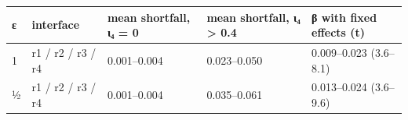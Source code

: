 \documentclass[10pt]{article}
\begin{document}
\begin{longtable}[]{@{}lllll@{}}
\toprule
\begin{minipage}[b]{0.17\columnwidth}\raggedright
ε\strut
\end{minipage} & \begin{minipage}[b]{0.17\columnwidth}\raggedright
interface\strut
\end{minipage} & \begin{minipage}[b]{0.17\columnwidth}\raggedright
mean shortfall, ι₄ = 0\strut
\end{minipage} & \begin{minipage}[b]{0.17\columnwidth}\raggedright
mean shortfall, ι₄ \textgreater{} 0.4\strut
\end{minipage} & \begin{minipage}[b]{0.17\columnwidth}\raggedright
β with fixed effects (t)\strut
\end{minipage}\tabularnewline
\midrule
\endhead
\begin{minipage}[t]{0.17\columnwidth}\raggedright
1\strut
\end{minipage} & \begin{minipage}[t]{0.17\columnwidth}\raggedright
r1 / r2 / r3 / r4\strut
\end{minipage} & \begin{minipage}[t]{0.17\columnwidth}\raggedright
0.001--0.004\strut
\end{minipage} & \begin{minipage}[t]{0.17\columnwidth}\raggedright
0.023--0.050\strut
\end{minipage} & \begin{minipage}[t]{0.17\columnwidth}\raggedright
0.009--0.023 (3.6--8.1)\strut
\end{minipage}\tabularnewline
\begin{minipage}[t]{0.17\columnwidth}\raggedright
½\strut
\end{minipage} & \begin{minipage}[t]{0.17\columnwidth}\raggedright
r1 / r2 / r3 / r4\strut
\end{minipage} & \begin{minipage}[t]{0.17\columnwidth}\raggedright
0.001--0.004\strut
\end{minipage} & \begin{minipage}[t]{0.17\columnwidth}\raggedright
0.035--0.061\strut
\end{minipage} & \begin{minipage}[t]{0.17\columnwidth}\raggedright
0.013--0.024 (3.6--9.6)\strut
\end{minipage}\tabularnewline
\bottomrule
\end{longtable}
\end{document}
